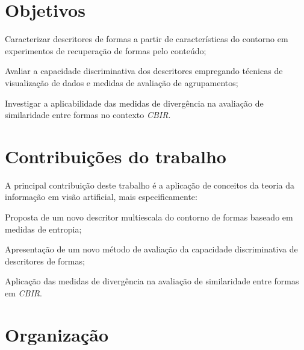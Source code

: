 
\section*{Objetivos}

\begin{alineas}
\item Caracterizar descritores de formas a partir de características do contorno em experimentos de recuperação de formas pelo conteúdo;

\item Avaliar a capacidade discriminativa dos descritores empregando técnicas de visualização de dados e medidas de avaliação de agrupamentos;  

\item Investigar a aplicabilidade das medidas de divergência na avaliação de similaridade entre formas no contexto \emph{CBIR}.
\end{alineas}

\section*{Contribuições do trabalho}

A principal contribuição deste trabalho é a aplicação de conceitos da teoria da informação em visão artificial, mais especificamente:

\begin{alineas}
\item Proposta de um novo descritor multiescala do contorno de formas baseado em medidas de entropia;
\item Apresentação de um novo método de avaliação da capacidade discriminativa de descritores de formas;
\item Aplicação das medidas de divergência na avaliação de similaridade entre formas em \emph{CBIR}.
\end{alineas}

\section*{Organização}

